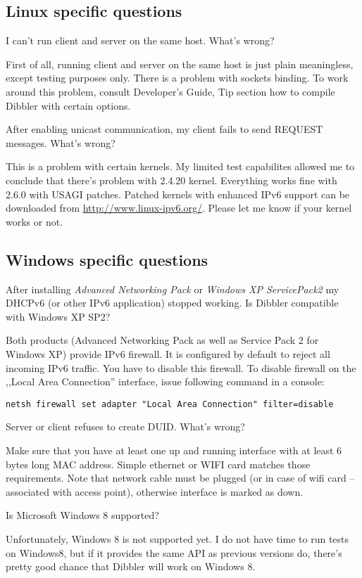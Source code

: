 \subsection{Linux specific questions}

\Q I can't run client and server on the same host. What's wrong?

\A First of all, running client and server on the same host is just
plain meaningless, except testing purposes only. There is a problem
with sockets binding. To work around this problem, consult Developer's
Guide, Tip section how to compile Dibbler with certain options.

\Q After enabling unicast communication, my client fails to send
REQUEST messages. What's wrong?

\A This is a problem with certain kernels. My limited test capabilites
allowed me to conclude that there's problem with 2.4.20
kernel. Everything works fine with 2.6.0 with USAGI patches. Patched
kernels with enhanced IPv6 support can be downloaded from
\url{http://www.linux-ipv6.org/}. Please let me know if your kernel
works or not.

\subsection{Windows specific questions}

\Q After installing \emph{Advanced Networking Pack} or \emph{Windows XP
  ServicePack2} my DHCPv6 (or other IPv6 application) stopped
working. Is Dibbler compatible with Windows XP SP2?

\A Both products (Advanced Networking Pack as well as Service Pack 2
for Windows XP) provide IPv6 firewall. It is configured by default to
reject all incoming IPv6 traffic. You have to disable this
firewall. To disable firewall on the ,,Local Area Connection''
interface, issue following command in a console:

\begin{lstlisting}
netsh firewall set adapter "Local Area Connection" filter=disable
\end{lstlisting}

\Q Server or client refuses to create DUID. What's wrong?

\A Make sure that you have at least one up and running interface with
at least 6 bytes long MAC address. Simple ethernet or WIFI card
matches those requirements. Note that network cable must be plugged
(or in case of wifi card -- associated with access point), otherwise
interface is marked as down.

\Q Is Microsoft Windows 8 supported?

\A Unfortunately, Windows 8 is not supported yet. I do not have time
to run tests on Windows8, but if it provides the same API as previous
versions do, there's pretty good chance that Dibbler will work on
Windows 8.
